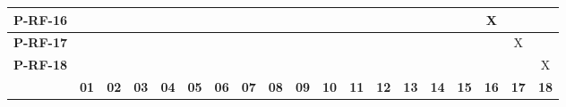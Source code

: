 \begin{table}[H]
{\begin{tabular}{|c|c|c|c|c|c|c|c|c|c|c|c|c|c|c|c|c|c|c|}
			\textbf{P-RF-16} &               &               &               &               &               &               &               &               &               &               &               &               &               &               &               & X             &               &               \\ \hline
			\textbf{P-RF-17} &               &               &               &               &               &               &               &               &               &               &               &               &               &               &               &               & X             &               \\ \hline
			\textbf{P-RF-18} &               &               &               &               &               &               &               &               &               &               &               &               &               &               &               &               &               & X             \\ \hline
			\textbf{}        & \textbf{01} & \textbf{02} & \textbf{03} & \textbf{04} & \textbf{05} & \textbf{06} & \textbf{07} & \textbf{08} & \textbf{09} & \textbf{10} & \textbf{11} & \textbf{12} & \textbf{13} & \textbf{14} & \textbf{15} & \textbf{16} & \textbf{17} & \textbf{18} \\ \hline
	\end{tabular}}
\end{table}


